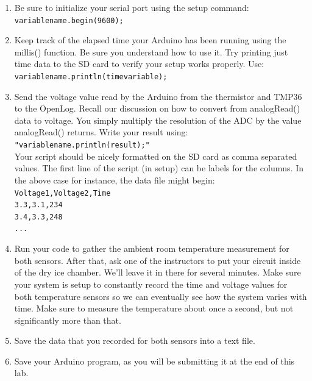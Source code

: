 \documentclass[12pt]{article}
\begin{document}
\begin{enumerate}
		\item Be sure to initialize your serial port using the setup command: \\ \texttt{variablename.begin(9600);}
	
		\item Keep track of the elapsed time your Arduino has been running using the millis() function. Be sure you understand how to use it. Try printing just time data to the SD card to verify your setup works properly. Use: \\ \texttt{variablename.println(timevariable);}
		
		\item Send the voltage value read by the Arduino from the thermistor and TMP36 to the OpenLog. Recall our discussion on how to convert from analogRead() data to voltage. You simply multiply the resolution of the ADC by the value analogRead() returns. Write your result using: \\ \texttt{"variablename.println(result);"} \\
		
		Your script should be nicely formatted on the SD card as comma separated values. The first line of the script (in setup) can be labels for the columns. In the above case for instance, the data file might begin: \\
			\texttt{Voltage1,Voltage2,Time\\
			3.3,3.1,234\\
			3.4,3.3,248\\
			...}
		
		\item Run your code to gather the ambient room temperature measurement for both sensors. After that, ask one of the instructors to put your circuit inside of the dry ice chamber. We'll leave it in there for several minutes. Make sure your system is setup to constantly record the time and voltage values for both temperature sensors so we can eventually see how the system varies with time. Make sure to measure the temperature about once a second, but not significantly more than that.
	
		\item Save the data that you recorded for both sensors into a text file.
		
		\item Save your Arduino program, as you will be submitting it at the end of this lab.
	
	\end{enumerate}
\end{document}
